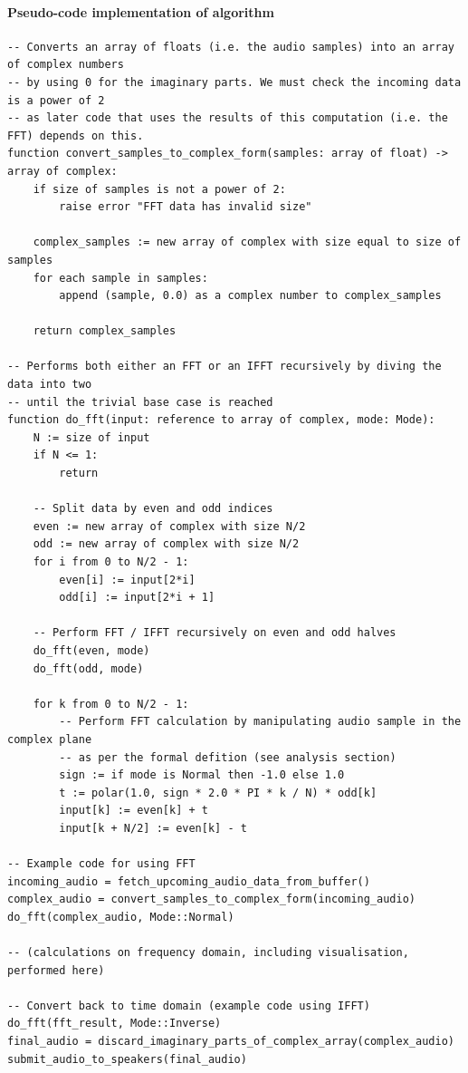\paragraph{Pseudo-code implementation of algorithm}
\begin{verbatim}
-- Converts an array of floats (i.e. the audio samples) into an array of complex numbers
-- by using 0 for the imaginary parts. We must check the incoming data is a power of 2
-- as later code that uses the results of this computation (i.e. the FFT) depends on this.
function convert_samples_to_complex_form(samples: array of float) -> array of complex:
	if size of samples is not a power of 2:
		raise error "FFT data has invalid size"

	complex_samples := new array of complex with size equal to size of samples
	for each sample in samples:
		append (sample, 0.0) as a complex number to complex_samples

	return complex_samples

-- Performs both either an FFT or an IFFT recursively by diving the data into two
-- until the trivial base case is reached
function do_fft(input: reference to array of complex, mode: Mode):
	N := size of input
	if N <= 1:
		return

	-- Split data by even and odd indices
	even := new array of complex with size N/2
	odd := new array of complex with size N/2
	for i from 0 to N/2 - 1:
		even[i] := input[2*i]
		odd[i] := input[2*i + 1]

	-- Perform FFT / IFFT recursively on even and odd halves
	do_fft(even, mode)
	do_fft(odd, mode)

	for k from 0 to N/2 - 1:
		-- Perform FFT calculation by manipulating audio sample in the complex plane
		-- as per the formal defition (see analysis section)
		sign := if mode is Normal then -1.0 else 1.0
		t := polar(1.0, sign * 2.0 * PI * k / N) * odd[k]
		input[k] := even[k] + t
		input[k + N/2] := even[k] - t

-- Example code for using FFT
incoming_audio = fetch_upcoming_audio_data_from_buffer()
complex_audio = convert_samples_to_complex_form(incoming_audio)
do_fft(complex_audio, Mode::Normal)

-- (calculations on frequency domain, including visualisation, performed here)

-- Convert back to time domain (example code using IFFT)
do_fft(fft_result, Mode::Inverse)
final_audio = discard_imaginary_parts_of_complex_array(complex_audio)
submit_audio_to_speakers(final_audio)
\end{verbatim}

